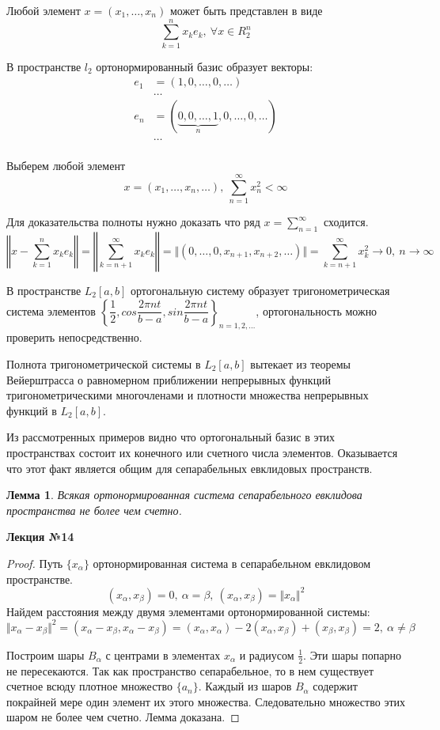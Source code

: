 \documentclass[14pt,a4paper]{extarticle}
\newtheorem{lemma}{Лемма}[section]
\theoremstyle{definition}
\theoremstyle{remark}
\renewcommand{\[}{\begin{dmath*}[compact]}
\renewcommand{\]}{\end{dmath*}}
\newcommand{\sep}{ , \ \allowbreak }
\newcommand\f[2]{\dfrac{#1}{#2}}
\begin{document}
Любой элемент $x=(x_1,\dots,x_n)$ может быть представлен в виде
\[\sum_{k=1}^n x_k e_k \sep {\forall x \in R_2^n}\]

В пространстве $l_2$ ортонормированный базис образует векторы:
\begin{align*}
  e_1&=(1,0,\dots,0,\dots) \\
  &\dots \\
  e_n&=(\underbrace{0,0,\dots,1}_n,0,\dots,0,\dots) \\
  &\dots \\
\end{align*}

Выберем любой элемент
\[x=(x_1,\dots,x_n,\dots) \sep \sum_{n=1}^\infty x_n^2 < \infty\]

Для доказательства полноты нужно доказать что ряд
$x = \sum_{n=1}^\infty$ сходится.
\[\left\Vert x - \sum_{k=1}^n x_k e_k \right\Vert \allowbreak
= \left\Vert \sum_{k=n+1}^\infty x_k e_k \right\Vert \allowbreak
= \Vert (0,\dots,0,x_{n+1}, x_{n+2},\dots) \Vert \allowbreak
= \sum_{k=n+1}^\infty x_k^2 \to 0 \sep {n \to \infty} \]

В пространстве $L_2[a,b]$ ортогональную систему образует
тригонометрическая система элементов
$\left\{ \f{1}{2}, cos \f{2 \pi n t}{b-a} ,
sin \f{2 \pi nt}{b-a} \right\}_{n=1,2,\dots} $,
ортогональность можно проверить непосредственно.

Полнота тригонометрической системы в $L_2[a,b]$ вытекает из теоремы Вейерштрасса
о равномерном приближении непрерывных функций тригонометрическими многочленами и
плотности множества непрерывных функций в $L_2[a,b]$.

Из рассмотренных примеров видно что ортогональный базис в этих пространствах
состоит их конечного или счетного числа элементов. Оказывается что этот факт
является общим для сепарабельных евклидовых пространств.

\begin{lemma}
  Всякая ортонормированная система сепарабельного евклидова пространства
  не более чем счетно.
\end{lemma}

\textbf{Лекция №14}

\begin{proof}
  Путь $\{x_\alpha\}$ ортонормированная система в
  сепарабельном евклидовом пространстве.
  \[(x_\alpha,x_\beta)=0 \sep \alpha = \beta \sep
  (x_\alpha,x_\beta) \allowbreak = \Vert x_\alpha \Vert ^2\]
  Найдем расстояния между двумя элементами ортонормированной системы:
  \[\Vert x_\alpha - x_\beta \Vert ^ 2 \allowbreak
  = (x_\alpha - x_\beta, x_\alpha - x_\beta) \allowbreak
  = (x_\alpha, x_\alpha) - 2(x_\alpha, x_\beta) + (x_\beta,x_\beta) \allowbreak
  = 2 \sep {\alpha \neq \beta}\]

  Построим шары $B_\alpha$ с центрами в элементах $x_\alpha$ и радиусом
  $\frac{1}{2}$.
  Эти шары попарно не пересекаются.
  Так как пространство сепарабельное,
  то в нем существует счетное всюду плотное множество $\{a_n\}$.
  Каждый из шаров $B_\alpha$ содержит покрайней мере один элемент их
  этого множества.
  Следовательно множество этих шаром не более чем счетно.
  Лемма доказана.
\end{proof}
\end{document}
